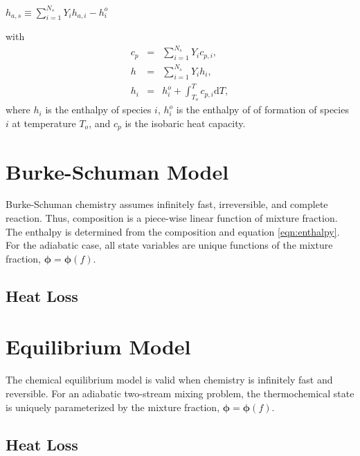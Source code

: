 \documentclass[10pt]{book}
\begin{document}
$h_{a,s} \equiv \sum_{i=1}^{N_s} Y_i h_{a,i}-h_i^o$

with
\begin{eqnarray}
  c_p &=& \sum_{i=1}^{N_s} Y_i c_{p,i},  \label{eqn:cp} \\
  h &=& \sum_{i=1}^{N_s} Y_i h_i,   \label{eqn:enthalpy} \\
  h_i &=& h_i^o + \int_{T_o}^T c_{p,i} \mathrm{d}T, \label{eqn:hi}
\end{eqnarray}
where $h_i$ is the enthalpy of species $i$, $h_i^o$ is the enthalpy of
of formation of species $i$ at temperature $T_o$, and $c_p$ is the
isobaric heat capacity.

\section{Burke-Schuman Model}
Burke-Schuman chemistry assumes infinitely fast, irreversible, and
complete reaction.  Thus, composition is a piece-wise linear function
of mixture fraction.  The enthalpy is determined from the composition
and equation \eqref{eqn:enthalpy}.  For the adiabatic case, all state
variables are unique functions of the mixture fraction,
$\boldsymbol{\phi} = \boldsymbol{\phi}(f)$.

\subsection{Heat Loss}

\section{Equilibrium Model}
The chemical equilibrium model is valid when chemistry is infinitely
fast and reversible.  For an adiabatic two-stream mixing problem, the
thermochemical state is uniquely parameterized by the mixture
fraction, $\boldsymbol{\phi} = \boldsymbol{\phi}(f)$.

\subsection{Heat Loss}


\end{document}
